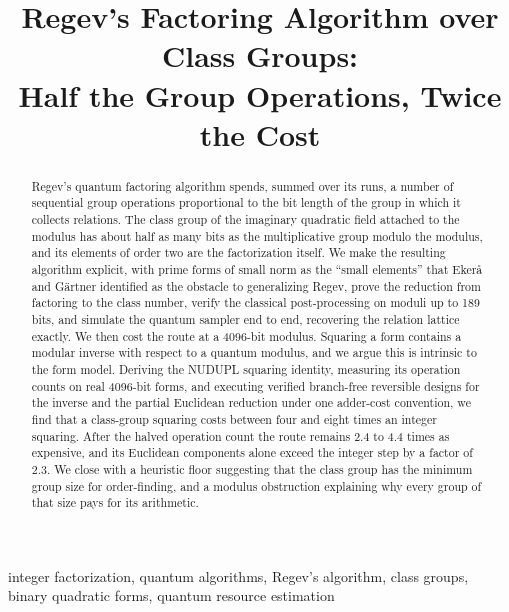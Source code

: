 \documentclass[conference]{IEEEtran}
\begin{document}
\title{Regev's Factoring Algorithm over Class Groups:\\ Half the Group Operations, Twice the Cost}
\author{}
\maketitle

\begin{abstract}
Regev's quantum factoring algorithm spends, summed over its runs, a number of sequential group operations proportional to the bit length of the group in which it collects relations. The class group of the imaginary quadratic field attached to the modulus has about half as many bits as the multiplicative group modulo the modulus, and its elements of order two are the factorization itself. We make the resulting algorithm explicit, with prime forms of small norm as the ``small elements'' that Eker\aa{} and G\"artner identified as the obstacle to generalizing Regev, prove the reduction from factoring to the class number, verify the classical post-processing on moduli up to 189 bits, and simulate the quantum sampler end to end, recovering the relation lattice exactly. We then cost the route at a 4096-bit modulus. Squaring a form contains a modular inverse with respect to a quantum modulus, and we argue this is intrinsic to the form model. Deriving the NUDUPL squaring identity, measuring its operation counts on real 4096-bit forms, and executing verified branch-free reversible designs for the inverse and the partial Euclidean reduction under one adder-cost convention, we find that a class-group squaring costs between four and eight times an integer squaring. After the halved operation count the route remains 2.4 to 4.4 times as expensive, and its Euclidean components alone exceed the integer step by a factor of 2.3. We close with a heuristic floor suggesting that the class group has the minimum group size for order-finding, and a modulus obstruction explaining why every group of that size pays for its arithmetic.
\end{abstract}
\begin{IEEEkeywords}
integer factorization, quantum algorithms, Regev's algorithm, class groups, binary quadratic forms, quantum resource estimation
\end{IEEEkeywords}
\end{document}
